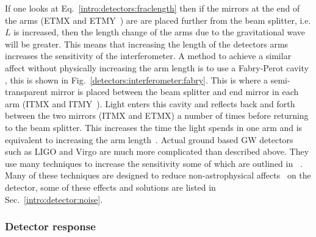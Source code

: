 If one looks at Eq.~\ref{intro:detectors:fraclength} then if the mirrors at the
end of the arms (ETMX and ETMY~) are are placed
further from the beam splitter, i.e. $L$ is increased, then the length change
of the arms due to the gravitational wave will be greater.  This means that
increasing the length of the detectors arms increases the sensitivity of the
interferometer.  A method to achieve a similar affect without physically
increasing the arm length is to use a Fabry-Perot cavity
\citep{aasi2015AdvancedLIGO}, this is shown in
Fig.~\ref{detectors:interferometer:fabry}.  This is where a semi-transparent
mirror is placed between the beam splitter and end mirror in each arm (ITMX and
ITMY~).  Light enters this cavity and reflects
back and forth between the two mirrors (ITMX and ETMX) a number of times before
returning to the beam splitter.  This increases the time the light spends in
one arm and is equivalent to increasing the arm length~.  Actual ground
based \gls{GW} detectors such as \gls{LIGO} \citep{abbott2009LIGOLaser} and
Virgo \citep{acernese2015AdvancedVirgo} are much more complicated than
described above.  They use many techniques to increase the sensitivity some of
which are outlined in
\citep{aasi2015AdvancedLIGO,abbott2009LIGOLaser}~.  Many of these techniques are
designed to reduce non-astrophysical affects~ on the detector,
some of these effects and solutions are listed in
Sec.~\ref{intro:detector:noise}.

\subsubsection{Detector response}


